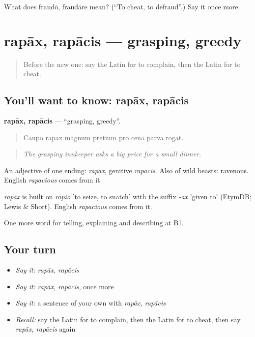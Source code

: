 \begin{tcolorbox}[breakable,colback=teal!4,colframe=teal!35!black,title={Before you move on}]
What does fraudō, fraudāre mean? (\textquotedblleft{}To cheat, to defraud\textquotedblright{}.) Say it once more.
\end{tcolorbox}
\section[rapāx, rapācis]{rapāx, rapācis — grasping, greedy}

\label{lesson:LA-C450-rapax}



\begin{quote}
Before the new one: say the Latin for to complain, then the Latin for to cheat.
\end{quote}

\subsection*{You'll want to know: rapāx, rapācis}
\textbf{rapāx, rapācis} — \textquotedblleft{}grasping, greedy\textquotedblright{}.

\begin{quote}
Caupō rapāx magnum pretium prō cēnā parvā rogat.
\end{quote}

\begin{quote}
\emph{The grasping innkeeper asks a big price for a small dinner.}
\end{quote}

An adjective of one ending: \emph{rapāx}, genitive \emph{rapācis}. Also of wild beasts: ravenous. English \emph{rapacious} comes from it.

\begin{cousinweb}
\emph{rapāx} is built on \emph{rapiō} 'to seize, to snatch' with the suffix \emph{-āx} 'given to' (EtymDB; Lewis \& Short). English \emph{rapacious} comes from it.
\end{cousinweb}

\begin{grammarlens}[title={What you've built}]
One more word for telling, explaining and describing at B1.
\end{grammarlens}

\subsection*{Your turn}
\begin{itemize}
\raggedright
  \item \emph{Say it:} \emph{rapāx, rapācis}
  \item \emph{Say it:} \emph{rapāx, rapācis}, once more
  \item \emph{Say it:} a sentence of your own with \emph{rapāx, rapācis}
  \item \emph{Recall:} say the Latin for to complain, then the Latin for to cheat, then say \emph{rapāx, rapācis} again
\end{itemize}

